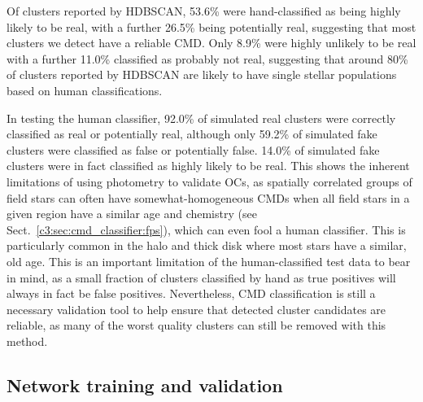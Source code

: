 Of clusters reported by HDBSCAN, 53.6\% were hand-classified as being highly likely to be real, with a further 26.5\% being potentially real, suggesting that most clusters we detect have a reliable CMD. Only 8.9\% were highly unlikely to be real with a further 11.0\% classified as probably not real, suggesting that around 80\% of clusters reported by HDBSCAN are likely to have single stellar populations based on human classifications. 

In testing the human classifier, 92.0\% of simulated real clusters were correctly classified as real or potentially real, although only 59.2\% of simulated fake clusters were classified as false or potentially false. 14.0\% of simulated fake clusters were in fact classified as highly likely to be real. This shows the inherent limitations of using photometry to validate OCs, as spatially correlated groups of field stars can often have somewhat-homogeneous CMDs when all field stars in a given region have a similar age and chemistry (see Sect.~\ref{c3:sec:cmd_classifier:fps}), which can even fool a human classifier. This is particularly common in the halo and thick disk where most stars have a similar, old age. This is an important limitation of the human-classified test data to bear in mind, as a small fraction of clusters classified by hand as true positives will always in fact be false positives. Nevertheless, CMD classification is still a necessary validation tool to help ensure that detected cluster candidates are reliable, as many of the worst quality clusters can still be removed with this method.



\subsection{Network training and validation}\label{c3:sec:cmd_classifier:train_and_val}

